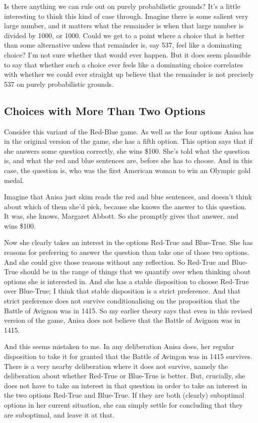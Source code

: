 \documentclass[11pt,]{book}
\begin{document}
Is there anything we can rule out on purely probabilistic grounds? It's a little interesting to think this kind of case through. Imagine there is some salient very large number, and it matters what the remainder is when that large number is divided by 1000, or 1000. Could we get to a point where a choice that is better than some alternative unless that remainder is, say 537, feel like a dominating choice? I'm not sure whether that would ever happen. But it does seem plausible to say that whether such a choice ever feels like a dominating choice correlates with whether we could ever straight up believe that the remainder is not precisely 537 on purely probabilistic grounds.

\hypertarget{threeway}{%
\subsection{Choices with More Than Two Options}\label{threeway}}

Consider this variant of the Red-Blue game. As well as the four options Anisa has in the original version of the game, she has a fifth option. This option says that if she answers some question correctly, she wins \$100. She's told what the question is, and what the red and blue sentences are, before she has to choose. And in this case, the question is, who was the first American woman to win an Olympic gold medal.

Imagine that Anisa just skim reads the red and blue sentences, and doesn't think about which of them she'd pick, because she knows the answer to this question. It was, she knows, Margaret Abbott. So she promptly gives that answer, and wins \$100.

Now she clearly takes an interest in the options Red-True and Blue-True. She has reasons for preferring to answer the question than take one of those two options. And she could give those reasons without any reflection. So Red-True and Blue-True should be in the range of things that we quantify over when thinking about options she is interested in. And she has a stable disposition to choose Red-True over Blue-True; I think that stable disposition is a strict preference. And that strict preference does not survive conditionalising on the proposition that the Battle of Avignon was in 1415. So my earlier theory says that even in this revised version of the game, Anisa does not believe that the Battle of Avignon was in 1415.

And this seems mistaken to me. In any deliberation Anisa does, her regular disposition to take it for granted that the Battle of Avingon was in 1415 survives. There is a very nearby deliberation where it does not survive, namely the deliberation about whether Red-True or Blue-True is better. But, crucially, she does not have to take an interest in that question in order to take an interest in the two options Red-True and Blue-True. If they are both (clearly) suboptimal options in her current situation, she can simply settle for concluding that they are suboptimal, and leave it at that.
\end{document}

